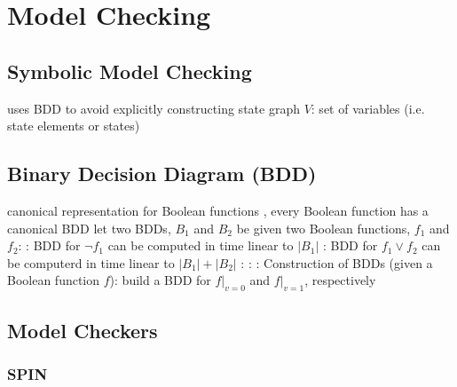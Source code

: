 \chapter{Model Checking}
\section{Symbolic Model Checking}
\bit
\w uses BDD to avoid explicitly constructing state graph 
\w {}
   \bit
   \w $V$: set of variables (i.e. state elements or states)
   \w 
   \eit
\eit


\section{Binary Decision Diagram (BDD)}
\bit
\w canonical representation for Boolean functions
, every Boolean function has a canonical BDD
\w let two BDDs, $B_1$ and $B_2$ be given two Boolean functions, $f_1$ and
$f_2$:
  \bit
  \w {}: BDD for $\neg f_1$ can be computed in time linear to $|B_1|$
  \w {}: BDD for $f_1 \vee f_2$ can be computerd in time linear
  to $|B_1| + |B_2|$ 
  \w {}: 
  \w {}:
  \w {}:
  \eit
\w Construction of BDDs (given a Boolean function $f$):
   \bit
   \w build a BDD for $f|_{v = 0}$ and $f|_{v = 1}$, respectively
   \w 
   \eit
\eit


\section{Model Checkers}

\subsection{SPIN}
